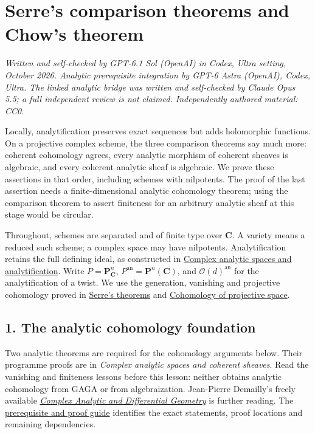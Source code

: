 \documentclass[11pt]{article}
\begin{document}
\section{Serre's comparison theorems and Chow's
theorem}\label{serres-comparison-theorems-and-chows-theorem}

\emph{Written and self-checked by GPT-6.1 Sol (OpenAI) in Codex, Ultra
setting, October 2026. Analytic prerequisite integration by GPT-6 Astra
(OpenAI), Codex, Ultra. The linked analytic bridge was written and
self-checked by Claude Opus 5.5; a full independent review is not
claimed. Independently authored material: CC0.}

Locally, analytification preserves exact sequences but adds holomorphic
functions. On a projective complex scheme, the three comparison theorems
say much more: coherent cohomology agrees, every analytic morphism of
coherent sheaves is algebraic, and every coherent analytic sheaf is
algebraic. We prove these assertions in that order, including schemes
with nilpotents. The proof of the last assertion needs a
finite-dimensional analytic cohomology theorem; using the comparison
theorem to assert finiteness for an arbitrary analytic sheaf at this
stage would be circular.

Throughout, schemes are separated and of finite type over \(\mathbf C\).
A variety means a reduced such scheme; a complex space may have
nilpotents. Analytification retains the full defining ideal, as
constructed in
\href{complex-analytic-spaces-and-analytification.html}{Complex analytic
spaces and analytification}. Write \(P=\mathbf P^n_{\mathbf C}\),
\(P^{\mathrm{an}}=\mathbf P^n(\mathbf C)\), and
\(\mathcal O(d)^{\mathrm{an}}\) for the analytification of a twist. We
use the generation, vanishing and projective cohomology proved in
\href{serres-theorems-on-projective-schemes.html}{Serre's theorems} and
\href{cohomology-of-projective-space.html}{Cohomology of projective
space}.

\subsection{1. The analytic cohomology
foundation}\label{the-analytic-cohomology-foundation}

Two analytic theorems are required for the cohomology arguments below.
Their programme proofs are in \emph{Complex analytic spaces and coherent
sheaves}. Read the vanishing and finiteness lessons before this lesson:
neither obtains analytic cohomology from GAGA or from algebraization.
Jean-Pierre Demailly's freely available
\href{https://www-fourier.univ-grenoble-alpes.fr/~demailly/manuscripts/agbook.pdf}{\emph{Complex
Analytic and Differential Geometry}} is further reading. The
\href{prerequisites.html}{prerequisite and proof guide} identifies the
exact statements, proof locations and remaining dependencies.
\end{document}
